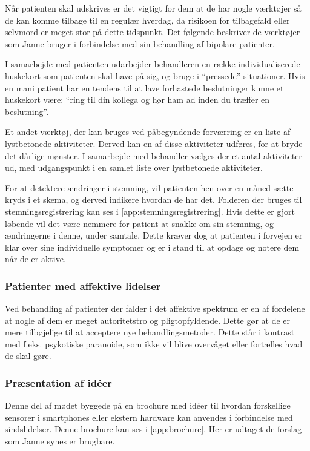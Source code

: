 Når patienten skal udskrives er det vigtigt for dem at de har nogle værktøjer så de kan komme tilbage til en regulær hverdag, da risikoen for tilbagefald eller selvmord er meget stor på dette tidspunkt. 
Det følgende beskriver de værktøjer som Janne bruger i forbindelse med sin behandling af bipolare patienter.
\begin{description}[style=nextline]
	\item[Huskekort] I samarbejde med patienten udarbejder behandleren en række individualiserede huskekort som patienten skal have på sig, og bruge i ``pressede'' situationer. 
	Hvis en mani patient har en tendens til at lave forhastede beslutninger kunne et huskekort være: ``ring til din kollega og hør ham ad inden du træffer en beslutning''.
	
	\item[Lystbetonede aktiviteter] Et andet værktøj, der kan bruges ved påbegyndende forværring er en liste af lystbetonede aktiviteter.
	Derved kan en af disse aktiviteter udføres, for at bryde det dårlige mønster.
	I samarbejde med behandler vælges der et antal aktiviteter ud, med udgangspunkt i en samlet liste over lystbetonede aktiviteter.
	
	\item[Stemningsregistrering] For at detektere ændringer i stemning, vil patienten hen over en måned sætte kryds i et skema, og derved indikere hvordan de har det.
	Folderen der bruges til stemningsregistrering kan ses i \cref{app:stemningsregistrering}.
	Hvis dette er gjort løbende vil det være nemmere for patient at snakke om sin stemning, og ændringerne i denne, under samtale.
	Dette kræver dog at patienten i forvejen er klar over sine individuelle symptomer og er i stand til at opdage og notere dem når de er aktive.
\end{description}

\subsubsection{Patienter med affektive lidelser}
Ved behandling af patienter der falder i det affektive spektrum er en af fordelene at nogle af dem er meget autoritetstro og pligtopfyldende.
Dette gør at de er mere tilbøjelige til at acceptere nye behandlingsmetoder.
Dette står i kontrast med f.eks. psykotiske paranoide, som ikke vil blive overvåget eller fortælles hvad de skal gøre.

\subsubsection{Præsentation af idéer}\label{janne_ideer}
Denne del af mødet byggede på en brochure med idéer til hvordan forskellige sensorer i smartphones eller ekstern hardware kan anvendes i forbindelse med sindslidelser. 
Denne brochure kan ses i \cref{app:brochure}.
Her er udtaget de forslag som Janne synes er brugbare.


